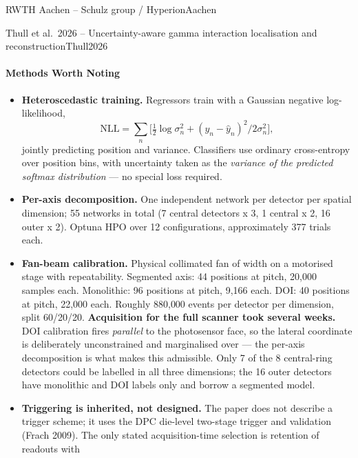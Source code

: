 \begin{programnote}{RWTH Aachen -- Schulz group / Hyperion}{Aachen}
\begin{papernote}{Thull et al.\ 2026 -- Uncertainty-aware gamma interaction localisation and reconstruction}{Thull2026}
\paragraph{Methods Worth Noting}
\begin{itemize}
    \item \textbf{Heteroscedastic training.} Regressors train with a Gaussian
        negative log-likelihood,
        \[\mathrm{NLL} = \sum_n \bigl[\tfrac{1}{2}\log \sigma_n^2
            + (y_n - \hat{y}_n)^2 / 2\sigma_n^2\bigr],\]
        jointly predicting position and variance. Classifiers use ordinary
        cross-entropy over position bins, with uncertainty taken as the \emph{variance of
        the predicted softmax distribution} --- no special loss required.
    \item \textbf{Per-axis decomposition.} One independent network per detector per spatial
        dimension; 55 networks in total (7 central detectors x 3, 1 central x 2, 16 outer
        x 2). Optuna HPO over 12 configurations, approximately 377 trials each.
    \item \textbf{Fan-beam calibration.} Physical collimated fan of  width on a
        motorised stage with  repeatability. Segmented axis: 44 positions at 
        pitch, 20{,}000 samples each. Monolithic: 96 positions at  pitch, 9{,}166
        each. DOI: 40 positions at  pitch, 22{,}000 each. Roughly 880{,}000 events
        per detector per dimension, split 60/20/20. \textbf{Acquisition for the full
        scanner took several weeks.} DOI calibration fires \emph{parallel} to the
        photosensor face, so the lateral coordinate is deliberately unconstrained and
        marginalised over --- the per-axis decomposition is what makes this admissible.
        Only 7 of the 8 central-ring detectors could be labelled in all three dimensions; the 16
        outer detectors have monolithic and DOI labels only and borrow a segmented model.
    \item \textbf{Triggering is inherited, not designed.} The paper does not describe a
        trigger scheme; it uses the DPC die-level two-stage trigger and validation (Frach
        2009). The only stated acquisition-time selection is retention of readouts with

\end{itemize}
\end{papernote}
\end{programnote}
